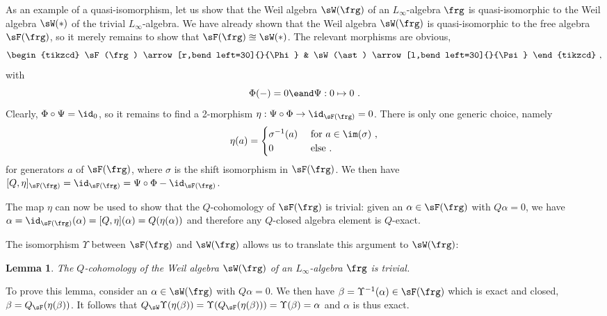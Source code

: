 \documentclass[reqno,a4paper,11pt]{article}
\newtheorem{lemma}[thm]{Lemma}
\begin{document}
As an example of a quasi-isomorphism, let us show that the Weil algebra $\sW(\frg)$ of an $L_\infty$-algebra $\frg$ is quasi-isomorphic to the Weil algebra $\sW(*)$ of the trivial $L_\infty$-algebra. We have already shown that the Weil algebra $\sW(\frg)$ is quasi-isomorphic to the free algebra $\sF(\frg)$, so it merely remains to show that $\sF(\frg)\approxeq\sW(*)$. The relevant morphisms are obvious,
\begin{equation}
 \begin{tikzcd}
    \sF(\frg)  \arrow[r,bend left=30]{}{\Phi} & \sW(\ast)  \arrow[l,bend left=30]{}{\Psi}
 \end{tikzcd}~,
\end{equation}
with 
\begin{equation}
\Phi(-)=0 \eand \Psi:0 \mapsto 0~.
\end{equation}
Clearly, $\Phi\circ \Psi=\id_0$, so it remains to find a 2-morphism $\eta:\Psi\circ\Phi\rightarrow \id_{\sF(\frg)}=0$. There is only one generic choice, namely 
\begin{equation}
 \eta(a)=\begin{cases}
       \sigma^{-1}(a) &\mbox{ for } a\in \im(\sigma)~,\\
       0 &\mbox{ else}~.
      \end{cases}
\end{equation}
for generators $a$ of $\sF(\frg)$, where $\sigma$ is the shift isomorphism in $\sF(\frg)$. We then have $[Q,\eta]_{\sF(\frg)}=\id_{\sF(\frg)}=\Psi\circ \Phi-\id_{\sF(\frg)}$.

The map $\eta$ can now be used to show that the $Q$-cohomology of $\sF(\frg)$ is trivial: given an $\alpha\in \sF(\frg)$ with $Q\alpha=0$, we have $\alpha=\id_{\sF(\frg)}(\alpha)=[Q,\eta] (\alpha)=Q(\eta(\alpha))$ and therefore any $Q$-closed algebra element is $Q$-exact.

The isomorphism $\Upsilon$ between $\sF(\frg)$ and $\sW(\frg)$ allows us to translate this argument to $\sW(\frg)$:
\begin{lemma}\label{lem:Q_cohomology_of_Weil_algebra_trivial}
 The $Q$-cohomology of the Weil algebra $\sW(\frg)$ of an $L_\infty$-algebra $\frg$ is trivial.
\end{lemma}
\noindent To prove this lemma, consider an $\alpha\in \sW(\frg)$ with $Q\alpha=0$. We then have $\beta=\Upsilon^{-1}(\alpha)\in \sF(\frg)$ which is exact and closed, $\beta=Q_\sF (\eta(\beta))$. It follows that $Q_\sW\Upsilon(\eta(\beta))=\Upsilon(Q_\sF(\eta(\beta)))=\Upsilon(\beta)=\alpha$ and $\alpha$ is thus exact.
\end{document}

